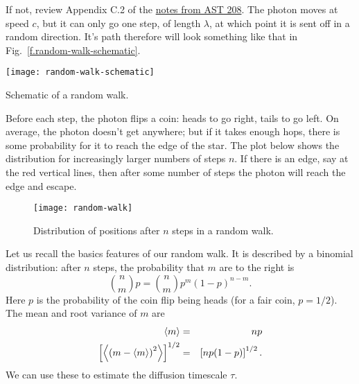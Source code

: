 If not, review Appendix C.2 of the \href{http://www.pa.msu.edu/~ebrown/docs/AST208-notes.pdf}{notes from AST 208}. The photon moves at speed $c$, but it can only go one step, of length $\lambda$, at which point it is sent off in a random direction. It's path therefore will look something like that in Fig.~\ref{f.random-walk-schematic}.
\begin{marginfigure}
\texttt{[image: random-walk-schematic]}
\caption{\label{f.random-walk-schematic}Schematic of a random walk.}
\end{marginfigure}

Before each step, the photon flips a coin: heads to go right, tails to go left. On average, the photon doesn't get anywhere; but if it takes enough hops, there is some probability for it to reach the edge of the star. The plot below shows the distribution for increasingly larger numbers of steps $n$. If there is an edge, say at the red vertical lines, then after some number of steps the photon will reach the edge and escape.

\begin{figure}[htbp]
\forceversofloat
\texttt{[image: random-walk]}
\caption{\label{f.random-walk} Distribution of positions after $n$ steps in a random walk.}
\end{figure}

Let us recall the basics features of our random walk. It is described by a binomial distribution: after $n$ steps, the probability that $m$ are to the right is
\begin{equation}\label{e.binomial}
    \binom{n}{m}{p} = {n\choose m} p^{m}(1-p)^{n-m}.
\end{equation}
Here $p$ is the probability of the coin flip being heads (for a fair coin, $p=1/2$).  The mean and root variance of $m$ are
\begin{eqnarray}
	\left\langle m\right\rangle &=& np \label{e.mean-binomial} \\
	\left[\left\langle\left(m-\left\langle m\right\rangle\right)^{2}\right\rangle\right]^{1/2} &=& \left[np(1-p)\right]^{1/2}. \label{e.var-binomial}
\end{eqnarray}
We can use these to estimate the diffusion timescale $\tau$.

